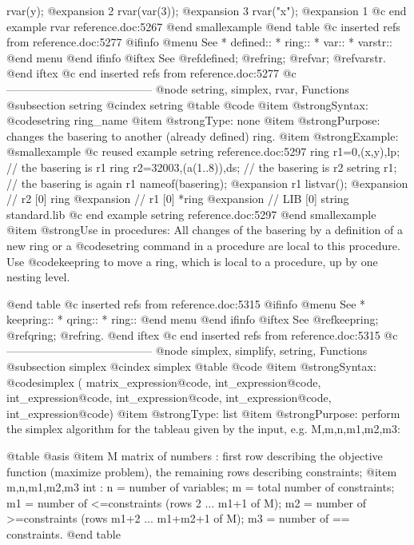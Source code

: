 {{{{{{  rvar(y);
@expansion{} 2
  rvar(var(3));
@expansion{} 3
  rvar("x");
@expansion{} 1
@c end example rvar reference.doc:5267
@end smallexample
@end table
@c inserted refs from reference.doc:5277
@ifinfo
@menu
See
* defined::
* ring::
* var::
* varstr::
@end menu
@end ifinfo
@iftex
See
@ref{defined};
@ref{ring};
@ref{var};
@ref{varstr}.
@end iftex
@c end inserted refs from reference.doc:5277
@c ---------------------------------------
@node setring, simplex, rvar, Functions
@subsection setring
@cindex setring
@table @code
@item @strong{Syntax:}
@code{setring} ring_name
@item @strong{Type:}
none
@item @strong{Purpose:}
changes the basering to another (already defined) ring.
@item @strong{Example:}
@smallexample
@c reused example setring reference.doc:5297 
  ring r1=0,(x,y),lp;
  // the basering is r1
  ring r2=32003,(a(1..8)),ds;
  // the basering is r2
  setring r1;
  // the basering is again r1
  nameof(basering);
@expansion{} r1
  listvar();
@expansion{} // r2                   [0]  ring
@expansion{} // r1                   [0]  *ring
@expansion{} // LIB                  [0]  string standard.lib
@c end example setring reference.doc:5297
@end smallexample
@item @strong{Use in procedures:}
All changes of the basering by a definition of a new ring or a
@code{setring} command in a procedure are local to this procedure.  Use
@code{keepring} to move a ring, which is local to a procedure, up by one
nesting level.

@end table
@c inserted refs from reference.doc:5315
@ifinfo
@menu
See
* keepring::
* qring::
* ring::
@end menu
@end ifinfo
@iftex
See
@ref{keepring};
@ref{qring};
@ref{ring}.
@end iftex
@c end inserted refs from reference.doc:5315
@c ---------------------------------------
@node simplex, simplify, setring, Functions
@subsection simplex
@cindex simplex
@table @code
@item @strong{Syntax:}
@code{simplex (} matrix_expression@code{,} int_expression@code{,} 
int_expression@code{,} int_expression@code{,} int_expression@code{,} 
int_expression@code{)}
@item @strong{Type:}
list
@item @strong{Purpose:}
perform the simplex algorithm for the tableau given by the input, e.g.
M,m,n,m1,m2,m3: 

@table @asis
@item  M matrix of numbers : 
     first row describing the objective function (maximize problem), 
     the remaining rows describing constraints; 
@item  m,n,m1,m2,m3 int :
     n = number of variables; 
     m = total number of constraints; 
     m1 = number of <=constraints (rows 2 ... m1+1 of M); 
     m2 = number of >=constraints (rows m1+2 ... m1+m2+1 of M); 
     m3 = number of == constraints.
@end table 

}}}}}}
